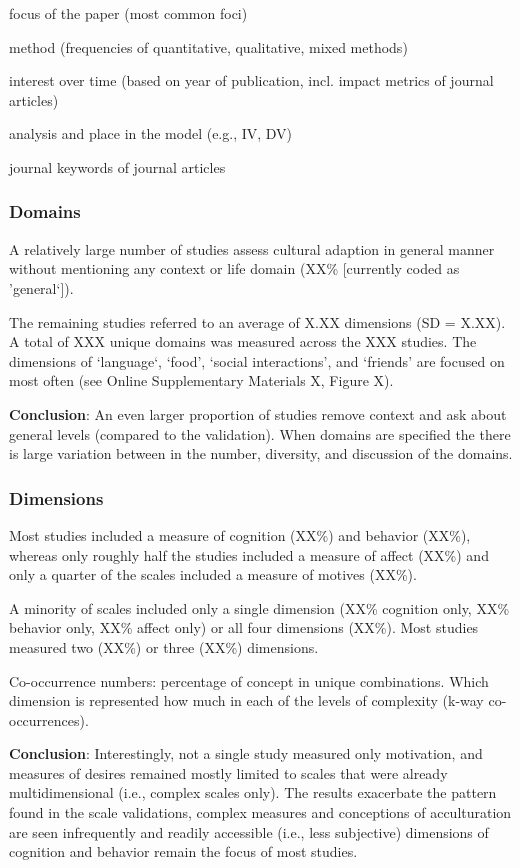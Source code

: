 \documentclass[man, 12pt, a4paper]{apa7}
\begin{document}
focus of the paper (most common foci)

method (frequencies of quantitative, qualitative, mixed methods)

interest over time (based on year of publication, incl. impact metrics of journal articles)

analysis and place in the model (e.g., IV, DV)

journal keywords of journal articles
\subsubsection{Domains}
A relatively large number of studies assess cultural adaption in general manner without mentioning any context or life domain (XX\% [currently coded as 'general‘]).

The remaining studies referred to an average of X.XX dimensions (SD = X.XX). A total of XXX unique domains was measured across the XXX studies. The dimensions of ‘language‘, ‘food’, ‘social interactions’, and ‘friends’ are focused on most often (see Online Supplementary Materials X, Figure X).

\textbf{Conclusion}: An even larger proportion of studies remove context and ask about general levels (compared to the validation). When domains are specified the there is large variation between in the number, diversity, and discussion of the domains.

\subsubsection{Dimensions}
Most studies included a measure of cognition (XX\%) and behavior (XX\%), whereas only roughly half the studies included a measure of affect (XX\%) and only a quarter of the scales included a measure of motives (XX\%).

A minority of scales included only a single dimension (XX\% cognition only, XX\% behavior only, XX\% affect only) or all four dimensions (XX\%). Most studies measured two (XX\%) or three (XX\%) dimensions.

Co-occurrence numbers: percentage of concept in unique combinations. Which dimension is represented how much in each of the levels of complexity (k-way co-occurrences).

\textbf{Conclusion}: Interestingly, not a single study measured only motivation, and measures of desires remained mostly limited to scales that were already multidimensional (i.e., complex scales only). The results exacerbate the pattern found in the scale validations, complex measures and conceptions of acculturation are seen infrequently and readily accessible (i.e., less subjective) dimensions of cognition and behavior remain the focus of most studies.
\end{document}
